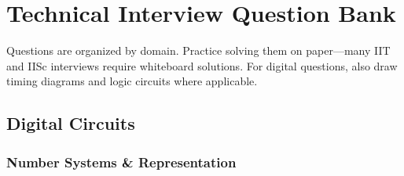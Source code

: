 
\chapter{Technical Interview Question Bank}
\label{app:questions}

\begin{protip}
  Questions are organized by domain. Practice solving them on paper---many IIT
  and IISc interviews require whiteboard solutions. For digital questions, also
  draw timing diagrams and logic circuits where applicable.
\end{protip}

\section{Digital Circuits}
\label{sec:iq-digital}

\subsection{Number Systems \& Representation}

